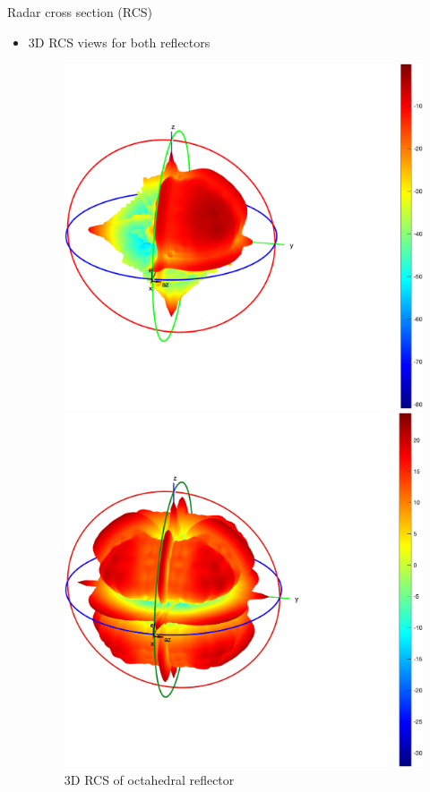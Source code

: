 \documentclass{beamer}
\newcounter{section}
\begin{document}
\begin{frame}[t]{Radar cross section (RCS)}
	\begin{itemize}
	    \item 3D RCS views for both reflectors
        \vspace{0.5\baselineskip}
            \begin{figure}
                \centering
                \begin{minipage}{0.47\textwidth}
                    \centering
                    \includegraphics[height=0.7\textwidth]{figures/trihe_3d_rcs.png}
                    \caption{3D RCS of trihedral reflector}
                \end{minipage}
                \begin{minipage}{0.47\textwidth}
                    \centering
                    \includegraphics[height=0.7\textwidth]{figures/octa_3d_rcs.png}
                    \caption{3D RCS of octahedral reflector}
                \end{minipage}
            \end{figure}
	\end{itemize}
\end{frame}
\end{document}
